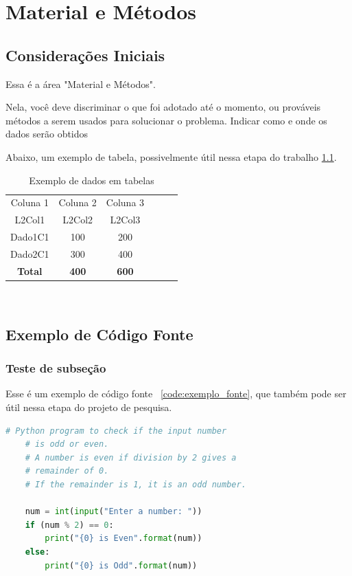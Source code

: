 \chapter{Material e Métodos}
\section {Considerações Iniciais}
Essa é a área "Material e Métodos".

Nela, você deve discriminar o que foi adotado até o momento, ou prováveis métodos a serem usados para solucionar o problema. Indicar como e onde os dados serão obtidos


Abaixo, um exemplo de tabela, possivelmente útil nessa etapa do trabalho \ref{tb:tabela_dados}.

\begin{table}[htbp]
\caption{Exemplo de dados em tabelas}
\label{tb:tabela_dados}
\centering
\setlength{\tabcolsep}{5pt}
\begin{tabular}{cccccc}
\hline
Coluna 1  &Coluna 2  &Coluna 3 \\
L2Col1 &L2Col2 &L2Col3 \\
\hline
Dado1C1 &100 &200 \\
Dado2C1 &300 &400 \\
\hline
\textbf{Total} &\textbf{400} &\textbf{600} \\
\hline
\end{tabular}
\\
\end{table}

\section{Exemplo de Código Fonte}
\subsection{ Teste de subseção}
Esse é um exemplo de código fonte ~\ref{code:exemplo_fonte}, que também pode ser útil nessa etapa do projeto de pesquisa.

\begin{lstlisting}[caption={Exemplo de código fonte}, language=Python, label=code:exemplo_fonte]
	# Python program to check if the input number
	# is odd or even.
	# A number is even if division by 2 gives a
	# remainder of 0.
	# If the remainder is 1, it is an odd number.
	
	num = int(input("Enter a number: "))
	if (num % 2) == 0:
		print("{0} is Even".format(num))
	else:
		print("{0} is Odd".format(num))
\end{lstlisting}	

